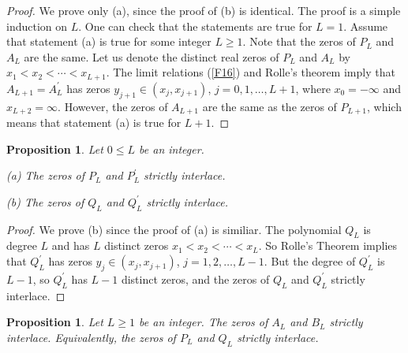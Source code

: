 \documentclass{article}
\newtheorem{prop}[thm]{Proposition}
\theoremstyle{remark}
\numberwithin{equation}{section}
\begin{document}
\begin{proof} We prove only (a), since the proof of (b) is identical.
The proof is a simple induction on $L$. One can check that the statements are true for $L=1$.
Assume that statement (a) is true for some integer $L\ge 1$. Note that the zeros of $P_L$ and $A_L$ are the same.
Let us denote the distinct real zeros of $P_L$ and $A_L$ by $x_1 < x_2 < \cdots < x_{L+1}$. The limit relations (\ref{F16}) 
and Rolle's theorem imply that $A_{L+1} = A^\prime_L$ has zeros $y_{j+1}\in (x_j,x_{j+1})$, $j=0,1,\ldots,L+1$, where $x_0 = -\infty$ and $x_{L+2} = \infty$.
However, the zeros of $A_{L+1}$ are the same as the zeros of $P_{L+1}$, which means that statement (a) is true for $L+1$.
\end{proof}

\begin{prop}\label{PPRIMEINTERLACE} Let $0 \leq L$ be an integer.

\medskip

\noindent (a) The zeros of $P_L$ and $P_L^\prime$ strictly interlace.

\medskip

\noindent (b) The zeros of $Q_L$ and $Q_L^\prime$  strictly interlace.

\end{prop}

\begin{proof}  We prove (b) since the proof of (a) is similiar.  The polynomial $Q_L$ is degree $L$ and has $L$ distinct zeros $x_1 < x_2 < \cdots < x_L$.
So Rolle's Theorem implies that $Q_L^\prime$ has zeros $y_j \in (x_j,x_{j+1})$, $j=1,2,\ldots,L-1$.
But the degree of $Q_L^\prime$ is $L-1$, so $Q_L^\prime$ has $L-1$ distinct zeros, and the zeros of $Q_L$ and $Q_L^\prime$ strictly interlace.
\end{proof}

\begin{prop}\label{PQINTERLACE}
Let $L \geq 1$ be an integer. The zeros of $A_L$ and $B_L$ strictly interlace.
Equivalently, the zeros of $P_L$ and $Q_L$ strictly interlace.
\end{prop}
\end{document}
